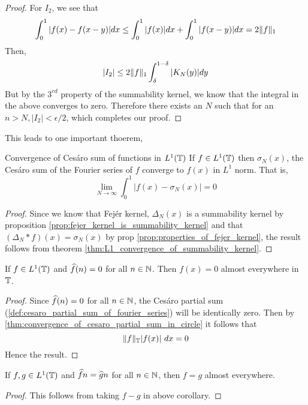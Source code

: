 \begin{proof}
    For $I_2$, we see that 
    \begin{displaymath}
      \int_0^1 |f(x) - f(x-y)|dx \le \int_0^1 |f(x)| dx + \int_0^1 |f(x-y)| dx = 2\lVert f\rVert_1
    \end{displaymath}
  Then,
  \begin{displaymath}
    |I_2| \le 2\lVert f\rVert_1 \int_{\delta}^{1-\delta} |K_N(y)|dy
  \end{displaymath}
But by the $3^{rd}$ property of the summability kernel, we know that the integral in the above converges to zero. Therefore there exists an $N$ such that for an $n>N, |I_2|< \epsilon/2$, which completes our proof.
  \end{proof}

  This leads to one important thoerem,
  \begin{theorem}{Convergence of Ces\'aro sum of functions in $L^1(\mathbb T)$}
    \label{thm:convergence_of_cesaro_partial_sum_in_circle}
    If $f\in L^1(\mathbb T)$ then $\sigma_N(x)$, the Ces\'aro sum of the Fourier series of $f$ converge to $f(x)$ in $L^1$ norm. That is, 
    \begin{displaymath}
      \lim_{N\to \infty} \int_0^1 \left|f(x) - \sigma_N(x)\right| = 0
    \end{displaymath}
  \end{theorem}
  \begin{proof}
    Since we know that Fej\'er kernel, $\Delta_N(x)$ is a summability kernel by proposition \ref{prop:fejer_kernel_is_summability_kernel} and that $(\Delta_N*f)(x) = \sigma_N(x)$ by prop \ref{prop:properties_of_fejer_kernel}, the result follows from theorem \ref{thm:L1_convergence_of_summability_kernel}.
  \end{proof}
  \begin{corollary}
    \label{cor:fourier_coefficients_are_zero}
    If $f \in L^1(\mathbb T)$ and $\widehat{f}(n) = 0$ for all $n \in \mathbb N$. Then $f(x) = 0$ almost everywhere in $\mathbb T$.
  \end{corollary}
  \begin{proof}
    Since $\widehat{f}(n) = 0$ for all $n\in \mathbb N$, the Ces\'aro partial sum (\autoref{def:cesaro_partial_sum_of_fourier_series}) will be identically zero. Then by \autoref{thm:convergence_of_cesaro_partial_sum_in_circle} it follows that $$\lVert f\rVert_{\mathbb T}|f(x)| \ dx = 0$$
    Hence the result.
  \end{proof}

  \begin{corollary}
    \label{cor:fourier_coefficients_are_equal}
    If $f, g \in L^1(\mathbb T)$ and $\widehat{f}{n} = \widehat{g}{n}$ for all $n\in \mathbb N$, then $f = g$ almost everywhere.
  \end{corollary}
  \begin{proof}
    This follows from taking $f-g$ in above corollary.
  \end{proof}

